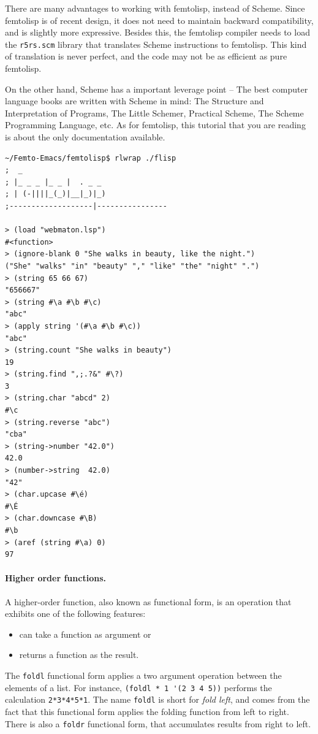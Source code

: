 \documentclass[a4paper,12pt]{book}
\begin{document}
There are many advantages to working
with femtolisp, instead of Scheme.
Since femtolisp is of recent design,
it does not need to maintain backward
compatibility, and is slightly more
expressive. Besides this, the
femtolisp compiler  needs
to load the \verb|r5rs.scm| library
that translates Scheme instructions
to femtolisp. This kind of translation
is never perfect, and the code may not
be as efficient as pure femtolisp.

On the other hand,  Scheme has a important
leverage point -- The best computer language
books are written with Scheme in mind: 
The Structure and Interpretation of Programs, 
The Little Schemer,
Practical Scheme,
The Scheme Programming Language,  etc.
As for femtolisp, this tutorial that you
are reading is about the only documentation
available.



\begin{verbatim}
~/Femto-Emacs/femtolisp$ rlwrap ./flisp
;  _
; |_ _ _ |_ _ |  . _ _
; | (-||||_(_)|__|_)|_)
;-------------------|----------------

> (load "webmaton.lsp")
#<function>
> (ignore-blank 0 "She walks in beauty, like the night.")
("She" "walks" "in" "beauty" "," "like" "the" "night" ".")
> (string 65 66 67)
"656667"
> (string #\a #\b #\c)
"abc"
> (apply string '(#\a #\b #\c))
"abc"
> (string.count "She walks in beauty")
19
> (string.find ",;.?&" #\?)
3
> (string.char "abcd" 2)
#\c
> (string.reverse "abc")
"cba"
> (string->number "42.0")
42.0
> (number->string  42.0)
"42"
> (char.upcase #\é)
#\É
> (char.downcase #\B)
#\b
> (aref (string #\a) 0)
97
\end{verbatim}

\paragraph{Higher order functions.}
A higher-order function, also known as
functional form, is an operation that
exhibits one of the following features:
\begin{itemize}
  \item can take a function as argument or
  \item returns a function as the result.
\end{itemize}

The \verb|foldl| functional form applies
a two argument operation between the
elements of a list. For instance,
\verb|(foldl * 1 '(2 3 4 5))| performs
the calculation \verb|2*3*4*5*1|.
The name \verb|foldl| is short for
{\em fold left}, and comes from the
fact that this functional form applies
the folding function from left to right.
There is also a \verb|foldr| functional
form, that accumulates results from
 right to left.\\
 
\end{document}
